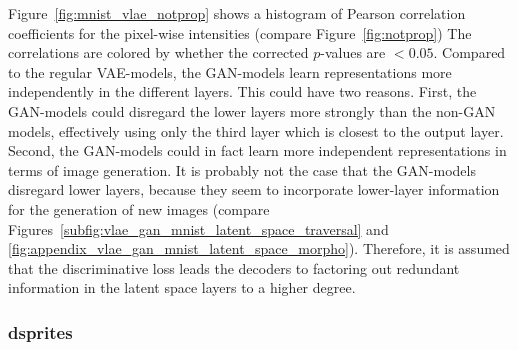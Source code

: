 Figure~\ref{fig:mnist_vlae_notprop} shows a histogram of Pearson correlation coefficients for the pixel-wise intensities (compare Figure~\ref{fig:notprop})
The correlations are colored by whether the corrected $p$-values are $< 0.05$.
Compared to the regular \ac{VAE}-models, the \ac{GAN}-models learn representations more independently in the different layers.
This could have two reasons.
First, the \ac{GAN}-models could disregard the lower layers more strongly than the non-\ac{GAN} models, effectively using only the third layer which is closest to the output layer.
Second, the \ac{GAN}-models could in fact learn more independent representations in terms of image generation.
It is probably not the case that the \ac{GAN}-models disregard lower layers, because they seem to incorporate lower-layer information for the generation of new images (compare Figures~\ref{subfig:vlae_gan_mnist_latent_space_traversal} and \ref{fig:appendix_vlae_gan_mnist_latent_space_morpho}).
Therefore, it is assumed that the discriminative loss leads the decoders to factoring out redundant information in the latent space layers to a higher degree.

\subsubsection{dsprites}

